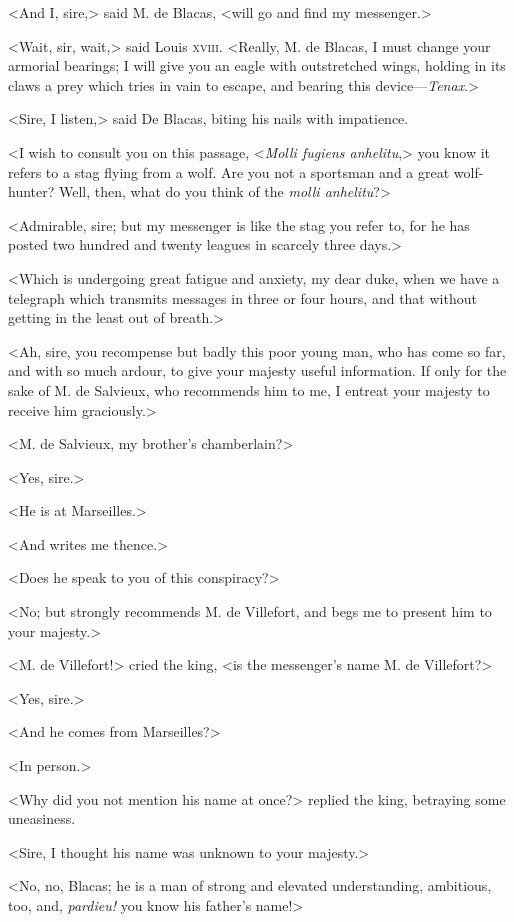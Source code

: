  <And I, sire,> said M. de Blacas, <will go and find my messenger.> 

 <Wait, sir, wait,> said Louis \textsc{xviii.} <Really, M. de Blacas, I must change your armorial bearings; I will give you an eagle with outstretched wings, holding in its claws a prey which tries in vain to escape, and bearing this device—\textit{Tenax}.>  
 
 <Sire, I listen,> said De Blacas, biting his nails with impatience. 

 <I wish to consult you on this passage, <\textit{Molli fugiens anhelitu},> you know it refers to a stag flying from a wolf. Are you not a sportsman and a great wolf-hunter? Well, then, what do you think of the \textit{molli anhelitu}?> 

 <Admirable, sire; but my messenger is like the stag you refer to, for he has posted two hundred and twenty leagues in scarcely three days.> 

 <Which is undergoing great fatigue and anxiety, my dear duke, when we have a telegraph which transmits messages in three or four hours, and that without getting in the least out of breath.> 

 <Ah, sire, you recompense but badly this poor young man, who has come so far, and with so much ardour, to give your majesty useful information. If only for the sake of M. de Salvieux, who recommends him to me, I entreat your majesty to receive him graciously.> 

 <M. de Salvieux, my brother's chamberlain?> 

 <Yes, sire.> 

 <He is at Marseilles.> 

 <And writes me thence.> 

 <Does he speak to you of this conspiracy?> 

 <No; but strongly recommends M. de Villefort, and begs me to present him to your majesty.> 

 <M. de Villefort!> cried the king, <is the messenger's name M. de Villefort?> 

 <Yes, sire.> 

 <And he comes from Marseilles?> 

 <In person.> 

 <Why did you not mention his name at once?> replied the king, betraying some uneasiness. 

 <Sire, I thought his name was unknown to your majesty.> 

 <No, no, Blacas; he is a man of strong and elevated understanding, ambitious, too, and, \textit{pardieu!} you know his father's name!> 

